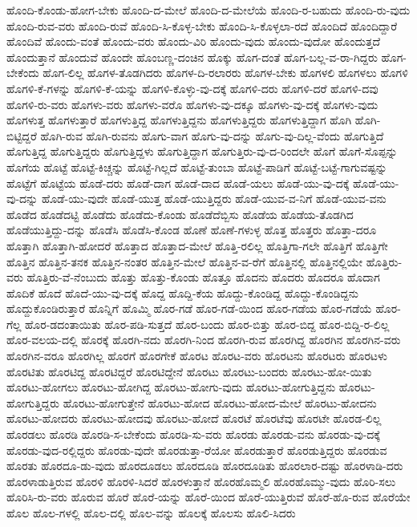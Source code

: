 {ಹೊಂದಿ-ಕೊಂಡು-ಹೋಗ-ಬೇಕು
ಹೊಂದಿ-ದ-ಮೇಲೆ
ಹೊಂದಿ-ದ-ಮೇಲೆಯೆ
ಹೊಂದಿ-ರ-ಬಹುದು
ಹೊಂದಿ-ರು-ವುದು
ಹೊಂದಿ-ರುವ-ವರು
ಹೊಂದಿ-ರುವೆ
ಹೊಂದಿ-ಸಿ-ಕೊಳ್ಳ-ಬೇಕು
ಹೊಂದಿ-ಸಿ-ಕೊಳ್ಳಲಾ-ರದೆ
ಹೊಂದಿದೆ
ಹೊಂದಿದ್ದಾರೆ
ಹೊಂದಿವೆ
ಹೊಂದು-ವಂತೆ
ಹೊಂದು-ವರು
ಹೊಂದು-ವಿರಿ
ಹೊಂದು-ವುದು
ಹೊಂದು-ವುದೋ
ಹೊಂದುತ್ತದೆ
ಹೊಂದುತ್ತಾನೆ
ಹೊಂದುವೆ
ಹೊಂದೇ
ಹೊಂಬಣ್ಣ-ದಂಚಿನ
ಹೊಕ್ಕು
ಹೊಗ-ದಂತೆ
ಹೊಗ-ಬಲ್ಲ-ವ-ರಾ-ಗಿದ್ದರು
ಹೊಗ-ಬೇಕೆಂದು
ಹೊಗ-ಲಿಲ್ಲ
ಹೊಗಳ-ತೊಡಗಿದರು
ಹೊಗಳ-ದಿ-ರಲಾರರು
ಹೊಗಳ-ಬೇಕು
ಹೊಗಳಲಿ
ಹೊಗಳಲು
ಹೊಗಳಿ
ಹೊಗಳಿ-ಕೆ-ಗಳನ್ನು
ಹೊಗಳಿ-ಕೆ-ಯನ್ನು
ಹೊಗಳಿ-ಕೊಳ್ಳು-ವು-ದಕ್ಕೆ
ಹೊಗಳಿ-ದರು
ಹೊಗಳಿ-ದರೆ
ಹೊಗಳಿ-ದವು
ಹೊಗಳಿ-ರು-ವರು
ಹೊಗಳು-ವರು
ಹೊಗಳು-ವರೊ
ಹೊಗಳು-ವು-ದಕ್ಕೂ
ಹೊಗಳು-ವು-ದಕ್ಕೆ
ಹೊಗಳು-ವುದು
ಹೊಗಳುತ್ತ
ಹೊಗಳುತ್ತಾರೆ
ಹೊಗಳುತ್ತಿದ್ದ
ಹೊಗಳುತ್ತಿದ್ದನು
ಹೊಗಳುತ್ತಿದ್ದರು
ಹೊಗಳುತ್ತಿದ್ದಾಗ
ಹೊಗಿ
ಹೊಗಿ-ಬಿಟ್ಟಿದ್ದರೆ
ಹೊಗಿ-ರುವ
ಹೊಗಿ-ರುವನು
ಹೊಗು-ವಾಗ
ಹೊಗು-ವು-ದನ್ನು
ಹೊಗು-ವು-ದಿಲ್ಲ-ವೆಂದು
ಹೊಗುತ್ತಿದೆ
ಹೊಗುತ್ತಿದ್ದ
ಹೊಗುತ್ತಿದ್ದರು
ಹೊಗುತ್ತಿದ್ದಳು
ಹೊಗುತ್ತಿದ್ದಾಗ
ಹೊಗುತ್ತಿರು-ವು-ದ-ರಿಂದಲೇ
ಹೊಗೆ
ಹೊಗೆ-ಸೊಪ್ಪನ್ನು
ಹೊಗೆಯ
ಹೊಟ್ಟೆ
ಹೊಟ್ಟೆ-ಕಿಚ್ಚನ್ನು
ಹೊಟ್ಟೆ-ಗಿಲ್ಲದೆ
ಹೊಟ್ಟೆ-ತುಂಬಾ
ಹೊಟ್ಟೆ-ಪಾಡಿಗೆ
ಹೊಟ್ಟೆ-ಬಟ್ಟೆ-ಗಾಗುವಷ್ಟನ್ನು
ಹೊಟ್ಟೆಗೆ
ಹೊಟ್ಟೆಯ
ಹೊಡೆ-ದರು
ಹೊಡೆ-ದಾಗ
ಹೊಡೆ-ದಾದ
ಹೊಡೆ-ಯಲು
ಹೊಡೆ-ಯು-ವು-ದಕ್ಕೆ
ಹೊಡೆ-ಯು-ವು-ದನ್ನು
ಹೊಡೆ-ಯು-ವುದೇ
ಹೊಡೆ-ಯುತ್ತ
ಹೊಡೆ-ಯುತ್ತಿದ್ದರು
ಹೊಡೆ-ಯುವ-ವ-ನಿಗೆ
ಹೊಡೆ-ಯುವ-ವನು
ಹೊಡೆದ
ಹೊಡೆದಟ್ಟಿ
ಹೊಡೆದು
ಹೊಡೆದು-ಕೊಂಡು
ಹೊಡೆದೆಬ್ಬಿಸು
ಹೊಡೆಯ
ಹೊಡೆಯ-ತೊಡಗಿದ
ಹೊಡೆಯುತ್ತಿದ್ದು-ದನ್ನು
ಹೊಡೆಸಿ
ಹೊಡೆಸಿ-ಕೊಂಡ
ಹೊಣೆ
ಹೊಣೆ-ಗಳುಳ್ಳ
ಹೊತ್ತ
ಹೊತ್ತರು
ಹೊತ್ತಾ-ದರೂ
ಹೊತ್ತಾಗಿ
ಹೊತ್ತಾಗಿ-ಹೋದರೆ
ಹೊತ್ತಾದ
ಹೊತ್ತಾದ-ಮೇಲೆ
ಹೊತ್ತಿ-ರಲಿಲ್ಲ
ಹೊತ್ತಿಗಾ-ಗಲೇ
ಹೊತ್ತಿಗೆ
ಹೊತ್ತಿಗೇ
ಹೊತ್ತಿನ
ಹೊತ್ತಿನ-ತನಕ
ಹೊತ್ತಿನ-ನಂತರ
ಹೊತ್ತಿನ-ಮೇಲೆ
ಹೊತ್ತಿನ-ವ-ರೆಗೆ
ಹೊತ್ತಿನಲ್ಲಿ
ಹೊತ್ತಿನಲ್ಲಿಯೇ
ಹೊತ್ತಿರು-ವರು
ಹೊತ್ತಿರು-ವೆ-ನೆಂಬುದು
ಹೊತ್ತು
ಹೊತ್ತು-ಕೊಂಡು
ಹೊತ್ತೂ
ಹೊದನು
ಹೊದರು
ಹೊದರೂ
ಹೊದಾಗ
ಹೊದಿಕೆ
ಹೊದೆ
ಹೊದೆ-ಯು-ವು-ದಕ್ಕೆ
ಹೊದ್ದ
ಹೊದ್ದಿ-ಕೆಯ
ಹೊದ್ದು-ಕೊಂಡಿದ್ದ
ಹೊದ್ದು-ಕೊಂಡಿದ್ದನು
ಹೊದ್ದುಕೊಂಡಿರುತ್ತಾರೆ
ಹೊನ್ನಿಗೆ
ಹೊಮ್ಮಿ
ಹೊರ-ಗಡೆ
ಹೊರ-ಗಡೆ-ಯಿಂದ
ಹೊರ-ಗಡೆಯ
ಹೊರ-ಗಡೆಯೆ
ಹೊರ-ಗೆಲ್ಲ
ಹೊರ-ಡದಂತಾಯಿತು
ಹೊರ-ಪಡಿ-ಸುತ್ತದೆ
ಹೊರ-ಬಂದು
ಹೊರ-ಬಿತ್ತು
ಹೊರ-ಬಿದ್ದ
ಹೊರ-ಬಿದ್ದಿ-ರ-ಲಿಲ್ಲ
ಹೊರ-ವಲಯ-ದಲ್ಲಿ
ಹೊರಕ್ಕೆ
ಹೊರಗಿ-ನದು
ಹೊರಗಿ-ನಿಂದ
ಹೊರಗಿ-ರುವ
ಹೊರಗಿದ್ದ
ಹೊರಗಿನ
ಹೊರಗಿನ-ವರು
ಹೊರಗಿನ-ವರೂ
ಹೊರಗಿಲ್ಲ
ಹೊರಗೆ
ಹೊರಗೇಕೆ
ಹೊರಟ
ಹೊರಟ-ವರು
ಹೊರಟನು
ಹೊರಟರು
ಹೊರಟಳು
ಹೊರಟಿತು
ಹೊರಟಿದ್ದ
ಹೊರಟಿದ್ದರೆ
ಹೊರಟಿದ್ದೇನೆ
ಹೊರಟು
ಹೊರಟು-ಬಂದರು
ಹೊರಟು-ಹೋ-ಯಿತು
ಹೊರಟು-ಹೋಗಲು
ಹೊರಟು-ಹೋಗಿದ್ದ
ಹೊರಟು-ಹೋಗು-ವುದು
ಹೊರಟು-ಹೋಗುತ್ತಿದ್ದನು
ಹೊರಟು-ಹೋಗುತ್ತಿದ್ದರು
ಹೊರಟು-ಹೋಗುತ್ತೇನೆ
ಹೊರಟು-ಹೋದ
ಹೊರಟು-ಹೋದ-ಮೇಲೆ
ಹೊರಟು-ಹೋದನು
ಹೊರಟು-ಹೋದರು
ಹೊರಟು-ಹೋದವು
ಹೊರಟು-ಹೋದೆ
ಹೊರಟೆ
ಹೊರಟೆವು
ಹೊರಟೇ
ಹೊರಡ-ಲಿಲ್ಲ
ಹೊರಡಲು
ಹೊರಡಿ
ಹೊರಡಿ-ಸ-ಬೇಕೆಂದು
ಹೊರಡಿ-ಸು-ವರು
ಹೊರಡು
ಹೊರಡು-ವನು
ಹೊರಡು-ವು-ದಕ್ಕೆ
ಹೊರಡು-ವುದ-ರಲ್ಲಿದ್ದರು
ಹೊರಡು-ವುದೇ
ಹೊರಡುತ್ತಾ-ರೆಯೋ
ಹೊರಡುತ್ತಾರೆ
ಹೊರಡುತ್ತಿದ್ದರು
ಹೊರಡುವ
ಹೊರತು
ಹೊರದೂ-ಡು-ವುದು
ಹೊರದೂಡಲು
ಹೊರದೂಡಿ
ಹೊರದೂಡಿತು
ಹೊರಲಾರ-ದಷ್ಟು
ಹೊರಳಾಡಿ-ದರು
ಹೊರಳಾಡುತ್ತಿರುವ
ಹೊರಳಿ
ಹೊರಳಿ-ಸಿದರೆ
ಹೊರಳುತ್ತಾನೆ
ಹೊರಹೊಮ್ಮಲಿ
ಹೊರಹೊಮ್ಮು-ವುದು
ಹೊರಿ-ಸಲು
ಹೊರಿಸಿ-ರು-ವರು
ಹೊರುವ
ಹೊರೆ
ಹೊರೆ-ಯನ್ನು
ಹೊರೆ-ಯಿಂದ
ಹೊರೆ-ಯುತ್ತಿರುವೆ
ಹೊರೆ-ಹೊ-ರುವ
ಹೊರೆಯೇ
ಹೊಲ
ಹೊಲ-ಗಳಲ್ಲಿ
ಹೊಲ-ದಲ್ಲಿ
ಹೊಲ-ವನ್ನು
ಹೊಲಕ್ಕೆ
ಹೊಲಸು
ಹೊಲಿ-ಸಿದರು
}
